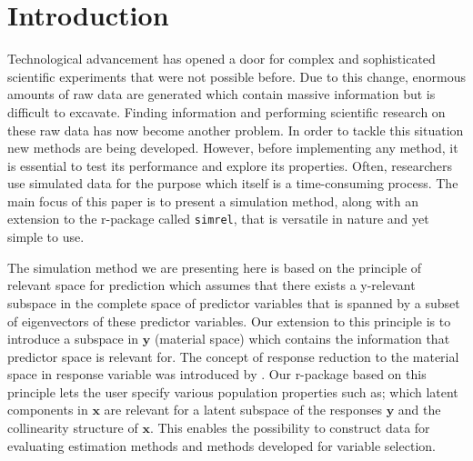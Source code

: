 \documentclass[review]{elsarticle}
\theoremstyle{definition}
\theoremstyle{definition}
\theoremstyle{definition}
\theoremstyle{remark}
\begin{document}
\section{Introduction}\label{introduction}

Technological advancement has opened a door for complex and
sophisticated scientific experiments that were not possible before. Due
to this change, enormous amounts of raw data are generated which contain
massive information but is difficult to excavate. Finding information
and performing scientific research on these raw data has now become
another problem. In order to tackle this situation new methods are being
developed. However, before implementing any method, it is essential to
test its performance and explore its properties. Often, researchers use
simulated data for the purpose which itself is a time-consuming process.
The main focus of this paper is to present a simulation method, along
with an extension to the r-package called \texttt{simrel}, that is
versatile in nature and yet simple to use.

The simulation method we are presenting here is based on the principle
of relevant space for prediction \citep{helland1994comparison} which
assumes that there exists a y-relevant subspace in the complete space of
predictor variables that is spanned by a subset of eigenvectors of these
predictor variables. Our extension to this principle is to introduce a
subspace in \(\mathbf{y}\) (material space) which contains the
information that predictor space is relevant for. The concept of
response reduction to the material space in response variable was
introduced by \citet{cook2010envelope}. Our r-package based on this
principle lets the user specify various population properties such as;
which latent components in \(\mathbf{x}\) are relevant for a latent
subspace of the responses \(\mathbf{y}\) and the collinearity structure
of \(\mathbf{x}\). This enables the possibility to construct data for
evaluating estimation methods and methods developed for variable
selection.
\end{document}
